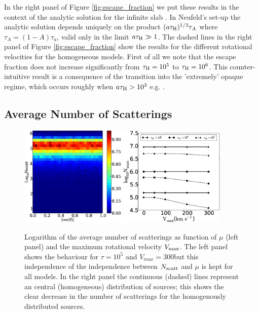 \documentclass{emulateapj}
\newcommand{\kms}{{\ifmmode{{\mathrm{\,km\ s}^{-1}}}\else{\,km~s$^{-1}$}\fi}}
\begin{document}
In the right panel of Figure \ref{fig:escape_fraction} we put these
results in the context of the analytic solution for the infinite slab
\citep{Neufeld90}. In Neufeld's set-up the analytic solution depends
uniquely on the product $(a\tau_{\rm   H})^{1/3}\tau_{A}$ where
$\tau_{A} = (1 - A)\tau_{a}$, valid only in the limit $a\tau_{\rm
  H}\gg 1$. The dashed lines in  the right panel of Figure
\ref{fig:escape_fraction} show the results for the different
rotational velocities for the homogeneous models. First of all we note
that the escape fraction does not increase significantly from
$\tau_{\rm H}=10^{5}$ to $\tau_{\rm H}=10^{6}$. This
counter-intuitive result is a consequence of the transition into the
'extremely' opaque regime,  which occurs roughly when $a\tau_{\rm{H}}
> 10^{3}$  e.g. \citep{Neufeld90}. 


\subsection{Average Number of Scatterings}
\label{sec:scatterings}

\begin{figure}
\begin{center}
    \includegraphics[width=0.45\textwidth]{nscattvsmu.eps}
    \includegraphics[width=0.45\textwidth]{f4.eps}
\end{center}
\caption{Logarithm of the average number of scatterings as function of
  $\mu$ (left panel) and the maximum rotational velocity $V_{\rm
    max}$. The left panel shows the behaviour for $\tau=10^{5}$ and
  $V_{max}=300$\kms but this independence of the independence between
  $N_{\rm scatt}$ and $\mu$ is kept for all models. 
  In the right panel the continuous (dashed) lines represent an
  central (homogeneous) distribution of sources; this shows the clear
  decrease in the number of scatterings for the homogenously
  distributed sources.
\label{fig:Nscatt} }    
\end{figure}
\end{document}

